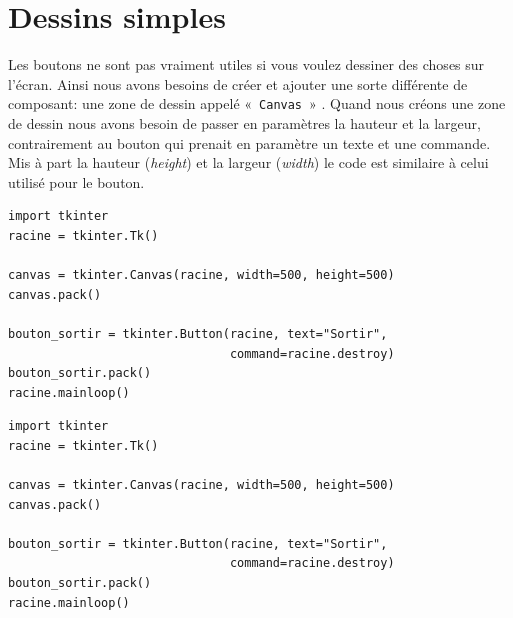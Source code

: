 \section{Dessins simples}

Les boutons ne sont pas vraiment utiles si vous voulez dessiner des choses sur l'écran. Ainsi nous avons besoins de créer et ajouter une sorte différente de composant: une zone de dessin appelé « \texttt{Canvas} » . Quand nous créons une zone de dessin nous avons besoin de passer en paramètres la hauteur et la largeur, contrairement au bouton qui prenait en paramètre un texte et une commande. Mis à part la hauteur (\emph{height}) et la largeur (\emph{width}) le code est similaire à celui utilisé pour le bouton.

\begin{Verbatim}[frame=single,rulecolor=\color{mbleu}, label=à taper]
import tkinter
racine = tkinter.Tk()

canvas = tkinter.Canvas(racine, width=500, height=500)
canvas.pack()

bouton_sortir = tkinter.Button(racine, text="Sortir",
                               command=racine.destroy)
bouton_sortir.pack()
racine.mainloop()
\end{Verbatim}

\begin{Verbatim}[frame=single,rulecolor=\color{mbleu}, label=à taper]
import tkinter
racine = tkinter.Tk()

canvas = tkinter.Canvas(racine, width=500, height=500)
canvas.pack()

bouton_sortir = tkinter.Button(racine, text="Sortir",
                               command=racine.destroy)
bouton_sortir.pack()
racine.mainloop()
\end{Verbatim}

